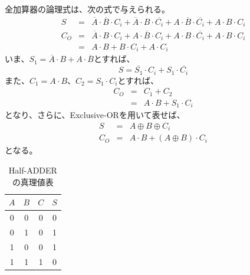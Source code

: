 \documentclass[12pt]{jarticle}
\begin{document}
\begin{itemize}
          全加算器の論理式は、次の式で与えられる。
          \begin{eqnarray*}
              S &=& \overline{A} \cdot \overline{B} \cdot C_i + \overline{A} \cdot B \cdot \overline{C_i} + A \cdot \overline{B} \cdot \overline{C_i} + A \cdot B \cdot C_i \\
              C_O &=& \overline{A} \cdot B \cdot C_i + A \cdot \overline{B} \cdot C_i + A \cdot B \cdot \overline{C_i} + A \cdot B \cdot C_i \nonumber \\
              &=& A \cdot B + B \cdot C_i + A \cdot C_i
          \end{eqnarray*}
          いま、$S_1 = \overline{A} \cdot B + A \cdot \overline{B}$とすれば、
          \begin{equation*}
              S = \overline{S_1} \cdot C_i + S_1 \cdot \overline{C_i}
          \end{equation*}
          また、$C_1 = A \cdot B$、$C_2 = S_1 \cdot C_i$とすれば、
          \begin{eqnarray*}
              C_O &=& C_1 + C_2  \\
              &=& A \cdot B + S_1 \cdot C_i
          \end{eqnarray*}
          となり、さらに、Exclusive-ORを用いて表せば、
          \begin{eqnarray*}
              S &=& A \oplus B \oplus C_i \\
              C_O &=& A \cdot B + (A \oplus B) \cdot C_i
          \end{eqnarray*}
          となる。

          \clearpage

          \begin{table}[h]
              \caption{Half-ADDERの真理値表}
              \begin{center}
                  \begin{tabular}{|c|c|c|c|}
                      \hline
                      $A$ & $B$ & $C$ & $S$ \\
                      \hline
                      0   & 0   & 0   & 0   \\
                      \hline
                      0   & 1   & 0   & 1   \\
                      \hline
                      1   & 0   & 0   & 1   \\
                      \hline
                      1   & 1   & 1   & 0   \\
                      \hline
                  \end{tabular}
              \end{center}
              \label{table9}
          \end{table}


\end{itemize}
\end{document}
